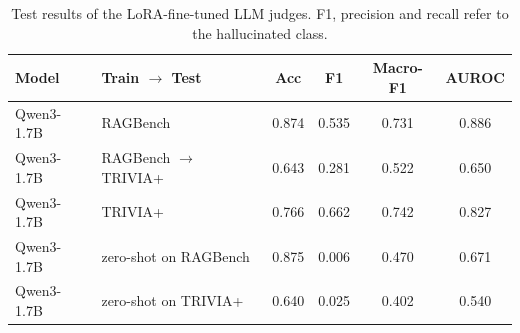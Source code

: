 \begin{table}[h]
    \centering
    \begin{tabular}{l l c c c c}
        \textbf{Model} & \textbf{Train $\rightarrow$ Test} & \textbf{Acc} & \textbf{F1} & \textbf{Macro-F1} & \textbf{AUROC} \\ \hline
        Qwen3-1.7B & RAGBench & 0.874 & 0.535 & 0.731 & 0.886 \\
        Qwen3-1.7B & RAGBench $\rightarrow$ TRIVIA+ & 0.643 & 0.281 & 0.522 & 0.650 \\
        Qwen3-1.7B & TRIVIA+ & 0.766 & 0.662 & 0.742 & 0.827 \\
        Qwen3-1.7B & zero-shot on RAGBench & 0.875 & 0.006 & 0.470 & 0.671 \\
        Qwen3-1.7B & zero-shot on TRIVIA+ & 0.640 & 0.025 & 0.402 & 0.540 \\
    \end{tabular}
    \caption[Person 3 results]{Test results of the LoRA-fine-tuned LLM judges. F1, precision and recall refer to the hallucinated class.}
    \label{tab:person3-results}
\end{table}
